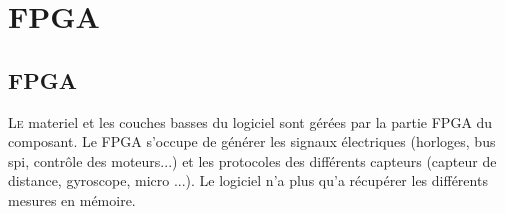 \newpage

\chapter{FPGA}
\section{FPGA}
\lettrine[lines=1]{L}e materiel et les couches basses du logiciel sont gérées par la partie FPGA du composant. Le FPGA s'occupe de générer les signaux électriques (horloges, bus spi, contrôle des moteurs...) et les protocoles des différents capteurs (capteur de distance, gyroscope, micro ...). Le logiciel n'a plus qu'a récupérer les différents mesures en mémoire.
 